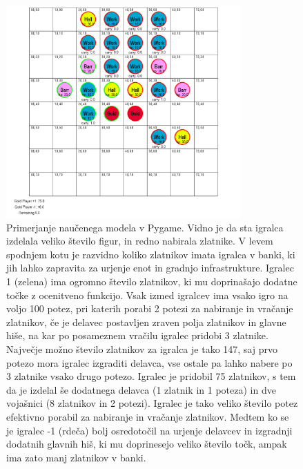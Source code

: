 \documentclass[a4paper, 12pt]{book}
\begin{document}
\begin{figure}[h!]
	\begin{center}
		\includegraphics[width=0.8\textwidth]{photos/pit_100_game1.pdf}
	\end{center}
	\caption{Primerjanje naučenega modela v Pygame. Vidno je da sta igralca izdelala veliko število figur, in redno nabirala zlatnike. 
		V levem spodnjem kotu je razvidno koliko zlatnikov imata igralca v banki, ki jih lahko zapravita za urjenje enot in gradnjo infrastrukture.
		Igralec 1 (zelena) ima ogromno število zlatnikov, ki mu doprinašajo dodatne točke z ocenitveno funkcijo.
		Vsak izmed igralcev ima vsako igro na voljo 100 potez, pri katerih porabi 2 potezi za nabiranje in vračanje zlatnikov, če je delavec postavljen zraven polja zlatnikov in glavne hiše, na kar po posameznem vračilu igralec pridobi 3 zlatnike. Največje možno število zlatnikov za igralca je tako 147, saj prvo potezo mora igralec izgraditi delavca, vse ostale pa lahko nabere po 3 zlatnike vsako drugo potezo.
		Igralec je pridobil 75 zlatnikov, s tem da je izdelal še dodatnega delavca (1 zlatnik in 1 poteza) in dve vojašnici (8 zlatnikov in 2 potezi).
		Igralec je tako veliko število potez efektivno porabil za nabiranje in vračanje zlatnikov.	Medtem ko se je igralec -1 (rdeča) bolj osredotočil na urjenje delavcev in izgradnji dodatnih glavnih hiš, ki mu doprinesejo veliko število točk, ampak ima zato manj zlatnikov v banki.}
	\label{pit_100_game1}
\end{figure}
\end{document}
